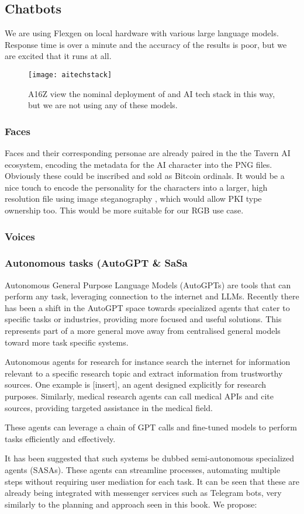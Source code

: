 \subsection{Chatbots}
We are using Flexgen \cite{Sheng2023} on local hardware with various large language models. Response time is over a minute and the accuracy of the results is poor, but we are excited that it runs at all.

\begin{figure}
  \centering
    \texttt{[image: aitechstack]}
  \caption{A16Z view the nominal deployment of and AI tech stack in this way, but we are not using any of these models.}
  	\label{fig:aitechstack}
\end{figure}


\subsubsection{Faces}
Faces and their corresponding personae are already paired in the the Tavern AI ecosystem, encoding the metadata for the AI character into the PNG files. Obviously these could be inscribed and sold as Bitcoin ordinals. It would be a nice touch to encode the personality for the characters into a larger, high resolution file using image steganography \cite{morkel2005overview}, which would allow PKI type ownership too. This would be more suitable for our RGB use case. 
\subsubsection{Voices}
\subsubsection{Autonomous tasks (AutoGPT \& SaSa}

Autonomous General Purpose Language Models (AutoGPTs) are tools that can perform any task, leveraging connection to the internet and LLMs. Recently there has been a shift in the AutoGPT space towards specialized agents that cater to specific tasks or industries, providing more focused and useful solutions. This represents part of a more general move away from centralised general models toward more task specific systems.\par
Autonomous agents for research for instance search the internet for information relevant to a specific research topic and extract information from trustworthy sources. One example is [insert], an agent designed explicitly for research purposes. Similarly, medical research agents can call medical APIs and cite sources, providing targeted assistance in the medical field.\par
These agents can leverage a chain of GPT calls and fine-tuned models to perform tasks efficiently and effectively.\par
It has been suggested that such systems be dubbed semi-autonomous specialized agents (SASAs). These agents can streamline processes, automating multiple steps without requiring user mediation for each task. It can be seen that these are already being integrated with messenger services such as Telegram bots, very similarly to the planning and approach seen in this book.
We propose:\par

